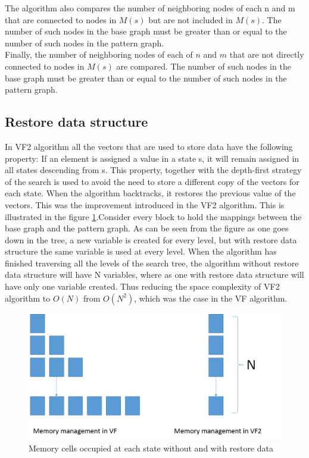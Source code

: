 The algorithm also compares the number of neighboring nodes of each n and m that are connected to nodes in $M(s)$ but are not
included in $M(s)$. The number of such nodes in the base graph must be greater than or equal to the number of such nodes in the pattern graph.\\

Finally, the number of neighboring nodes of each of $n$ and $m$ that are not directly connected to nodes in $M(s)$ are compared. The number of 
such nodes in the base graph must be greater than or equal to the number of such nodes in the pattern graph.

\subsection{Restore data structure}
In VF2 algorithm all the vectors that are used to store data have the following property: If an element is assigned a value in a state s, it will remain assigned in all states descending from s. This property, together with the depth-first strategy of the search is used to avoid the need to store a different copy of the vectors for each state. When the algorithm backtracks, it restores the previous value of the vectors. This was the improvement introduced in the VF2 algorithm. This is illustrated in the figure \ref{fig:memManagement}.Consider every block to hold the mappings between the base graph and the pattern graph. As can be seen from the figure as one goes down in the tree, a new variable is created for every level, but with restore data structure the same variable is used at every level. When the algorithm has finished traversing all the levels of the search tree, the algorithm without restore data structure will have N variables, where as one with restore data structure will have only one variable created. Thus reducing the space complexity of VF2 algorithm to $O(N)$ from $O(N^2)$, which was the case in the VF algorithm.

\begin{figure}[!ht]
\includegraphics[scale=0.5]{./pics/memManagement.png}
\caption{Memory cells occupied at each state without and with restore data}
\label{fig:memManagement}
\centering
\end{figure}

